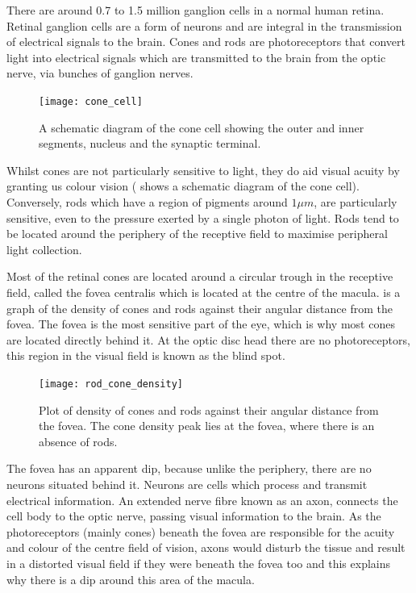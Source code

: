 There are around 0.7 to 1.5 million ganglion cells in a normal human retina.
\cite{curcio1990topography} Retinal ganglion cells are a form of neurons
and are integral in the transmission of electrical signals to the brain.
\cite{meyer1995characterization} Cones and rods are photoreceptors
that convert light into electrical signals which are transmitted to the
brain from the optic nerve, via bunches of ganglion nerves.

\begin{figure}[H]
\centering
  \texttt{[image: cone\_cell]}
\caption{A schematic diagram of the cone cell showing the outer and inner
segments, nucleus and the synaptic terminal.\cite{wikicone}}
\label{fig:cone}
\end{figure}

Whilst cones are not particularly sensitive to light, they do aid visual
acuity by granting us colour vision ( shows a schematic
diagram of the cone cell).\cite{bowmaker1980visual} Conversely, rods
which have a region of pigments around $1\mu{m}$, are particularly
sensitive, even to the pressure exerted by a single photon of light.
Rods tend to be located around the periphery of the receptive field to
maximise peripheral light collection.
\cite{liebman1964sensitive,baylor1979responses}

Most of the retinal cones are located around a circular trough in the
receptive field, called the fovea centralis which is located at the centre
of the macula.\cite{hendrickson1994primate}
 is a graph of the density of cones and rods
against their angular distance from the fovea. The fovea is the most
sensitive part of the eye, which is why most cones are located directly
behind it. At the optic disc head there are no photoreceptors, this region
in the visual field is known as the blind spot.

\begin{figure}[H]
\centering
  \texttt{[image: rod\_cone\_density]}
\caption{Plot of density of cones and rods against their angular distance from
the fovea. The cone density peak lies at the fovea, where there is an absence
of rods.\cite{yannuzzi2011retinal}}
\label{fig:rod_cone_density}
\end{figure}

The fovea has an apparent dip, because unlike the periphery, there are
no neurons situated behind it. Neurons are cells which process and
transmit electrical information. An extended nerve fibre known as an axon,
connects the cell body to the optic nerve, passing visual information to the
brain. As the photoreceptors (mainly cones) beneath the fovea are responsible
for the acuity and colour of the centre field of vision, axons would disturb the
tissue and result in a distorted visual field if they were beneath the fovea too
and this explains why there is a dip around this area of the macula.
 
